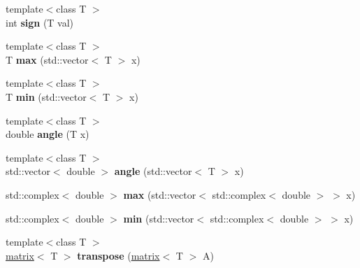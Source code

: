 \begin{DoxyCompactItemize}
\item 
\hypertarget{namespacekeycpp_a8f1cd159623e23abeedd26d34fc500d9}{{\footnotesize template$<$class T $>$ }\\int {\bfseries sign} (T val)}\label{namespacekeycpp_a8f1cd159623e23abeedd26d34fc500d9}

\item 
\hypertarget{namespacekeycpp_abebb8d8939a33f6c3cb00be9278114c6}{{\footnotesize template$<$class T $>$ }\\T {\bfseries max} (std\-::vector$<$ T $>$ x)}\label{namespacekeycpp_abebb8d8939a33f6c3cb00be9278114c6}

\item 
\hypertarget{namespacekeycpp_a8ef49e492f67187d0909c7ae093fee48}{{\footnotesize template$<$class T $>$ }\\T {\bfseries min} (std\-::vector$<$ T $>$ x)}\label{namespacekeycpp_a8ef49e492f67187d0909c7ae093fee48}

\item 
\hypertarget{namespacekeycpp_a83c90b0df3a170c845b848593be4cb74}{{\footnotesize template$<$class T $>$ }\\double {\bfseries angle} (T x)}\label{namespacekeycpp_a83c90b0df3a170c845b848593be4cb74}

\item 
\hypertarget{namespacekeycpp_a13ee1c3dd9cbb21a325260188a7fa860}{{\footnotesize template$<$class T $>$ }\\std\-::vector$<$ double $>$ {\bfseries angle} (std\-::vector$<$ T $>$ x)}\label{namespacekeycpp_a13ee1c3dd9cbb21a325260188a7fa860}

\item 
\hypertarget{namespacekeycpp_a73269c9db9fe25412819858bd7048ae5}{std\-::complex$<$ double $>$ {\bfseries max} (std\-::vector$<$ std\-::complex$<$ double $>$ $>$ x)}\label{namespacekeycpp_a73269c9db9fe25412819858bd7048ae5}

\item 
\hypertarget{namespacekeycpp_ab7577228b38fa6a1911ac65fb80832f3}{std\-::complex$<$ double $>$ {\bfseries min} (std\-::vector$<$ std\-::complex$<$ double $>$ $>$ x)}\label{namespacekeycpp_ab7577228b38fa6a1911ac65fb80832f3}

\item 
\hypertarget{namespacekeycpp_ad68697505d1a1a85f30a18b0e9b0eb2f}{{\footnotesize template$<$class T $>$ }\\\hyperlink{classkeycpp_1_1matrix}{matrix}$<$ T $>$ {\bfseries transpose} (\hyperlink{classkeycpp_1_1matrix}{matrix}$<$ T $>$ A)}\label{namespacekeycpp_ad68697505d1a1a85f30a18b0e9b0eb2f}


\end{DoxyCompactItemize}
